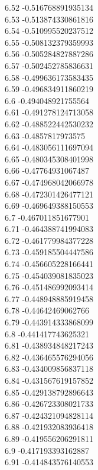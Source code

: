 {6.52	-0.516768891935134\\
6.53	-0.513874330861816\\
6.54	-0.510995520237512\\
6.55	-0.508132379359993\\
6.56	-0.505284827887286\\
6.57	-0.502452785836631\\
6.58	-0.499636173583435\\
6.59	-0.496834911860219\\
6.6	-0.494048921755564\\
6.61	-0.491278124713058\\
6.62	-0.488522442530232\\
6.63	-0.4857817973575\\
6.64	-0.483056111697094\\
6.65	-0.480345308401998\\
6.66	-0.47764931067487\\
6.67	-0.474968042066978\\
6.68	-0.472301426477121\\
6.69	-0.469649388150553\\
6.7	-0.467011851677901\\
6.71	-0.464388741994083\\
6.72	-0.461779984377228\\
6.73	-0.459185504447586\\
6.74	-0.456605228166441\\
6.75	-0.454039081835023\\
6.76	-0.451486992093414\\
6.77	-0.448948885919458\\
6.78	-0.44642469062766\\
6.79	-0.443914333868099\\
6.8	-0.441417743625321\\
6.81	-0.438934848217243\\
6.82	-0.436465576294056\\
6.83	-0.434009856837118\\
6.84	-0.431567619157852\\
6.85	-0.429138792896643\\
6.86	-0.426723308021733\\
6.87	-0.424321094828114\\
6.88	-0.421932083936418\\
6.89	-0.419556206291811\\
6.9	-0.417193393162887\\
6.91	-0.414843576140553\\
}
